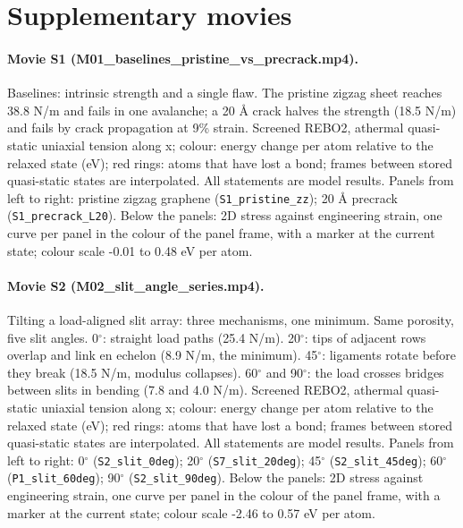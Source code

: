 
\section*{Supplementary movies}

\paragraph{Movie S1 (M01\_baselines\_pristine\_vs\_precrack.mp4).} Baselines: intrinsic strength and a single flaw. The pristine zigzag sheet reaches 38.8 N/m and fails in one avalanche; a 20 \AA{} crack halves the strength (18.5 N/m) and fails by crack propagation at 9\% strain. Screened REBO2, athermal quasi-static uniaxial tension along x; colour: energy change per atom relative to the relaxed state (eV); red rings: atoms that have lost a bond; frames between stored quasi-static states are interpolated. All statements are model results. Panels from left to right: pristine zigzag graphene (\texttt{S1\_pristine\_zz}); 20 \AA{} precrack (\texttt{S1\_precrack\_L20}). Below the panels: 2D stress against engineering strain, one curve per panel in the colour of the panel frame, with a marker at the current state; colour scale -0.01 to 0.48 eV per atom.

\paragraph{Movie S2 (M02\_slit\_angle\_series.mp4).} Tilting a load-aligned slit array: three mechanisms, one minimum. Same porosity, five slit angles. 0$^\circ$: straight load paths (25.4 N/m). 20$^\circ$: tips of adjacent rows overlap and link en echelon (8.9 N/m, the minimum). 45$^\circ$: ligaments rotate before they break (18.5 N/m, modulus collapses). 60$^\circ$ and 90$^\circ$: the load crosses bridges between slits in bending (7.8 and 4.0 N/m). Screened REBO2, athermal quasi-static uniaxial tension along x; colour: energy change per atom relative to the relaxed state (eV); red rings: atoms that have lost a bond; frames between stored quasi-static states are interpolated. All statements are model results. Panels from left to right: 0$^\circ$ (\texttt{S2\_slit\_0deg}); 20$^\circ$ (\texttt{S7\_slit\_20deg}); 45$^\circ$ (\texttt{S2\_slit\_45deg}); 60$^\circ$ (\texttt{P1\_slit\_60deg}); 90$^\circ$ (\texttt{S2\_slit\_90deg}). Below the panels: 2D stress against engineering strain, one curve per panel in the colour of the panel frame, with a marker at the current state; colour scale -2.46 to 0.57 eV per atom.

